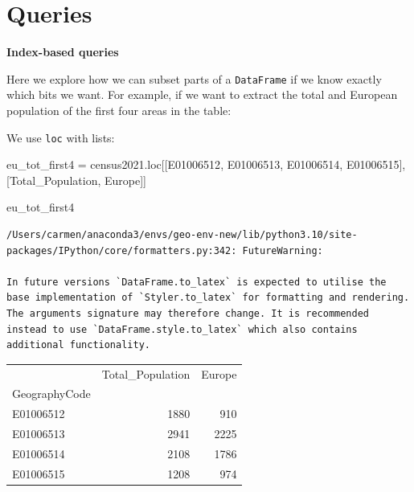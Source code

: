 \documentclass[
  letterpaper,
  DIV=11,
  numbers=noendperiod]{scrreprt}
\newenvironment{Shaded}{\begin{snugshade}}{\end{snugshade}}
\newcommand{\NormalTok}[1]{\textcolor[rgb]{0.00,0.23,0.31}{#1}}
\newcommand{\OperatorTok}[1]{\textcolor[rgb]{0.37,0.37,0.37}{#1}}
\newcommand{\StringTok}[1]{\textcolor[rgb]{0.13,0.47,0.30}{#1}}
\begin{document}
\section*{Queries}\label{queries}


\textbf{Index-based queries}

Here we explore how we can subset parts of a \texttt{DataFrame} if we
know exactly which bits we want. For example, if we want to extract the
total and European population of the first four areas in the table:

We use \texttt{loc} with lists:

\begin{Shaded}
\begin{Highlighting}[]
\NormalTok{eu\_tot\_first4 }\OperatorTok{=}\NormalTok{ census2021.loc[[}\StringTok{\textquotesingle{}E01006512\textquotesingle{}}\NormalTok{, }\StringTok{\textquotesingle{}E01006513\textquotesingle{}}\NormalTok{, }\StringTok{\textquotesingle{}E01006514\textquotesingle{}}\NormalTok{, }\StringTok{\textquotesingle{}E01006515\textquotesingle{}}\NormalTok{], [}\StringTok{\textquotesingle{}Total\_Population\textquotesingle{}}\NormalTok{, }\StringTok{\textquotesingle{}Europe\textquotesingle{}}\NormalTok{]]}

\NormalTok{eu\_tot\_first4}
\end{Highlighting}
\end{Shaded}

\begin{verbatim}
/Users/carmen/anaconda3/envs/geo-env-new/lib/python3.10/site-packages/IPython/core/formatters.py:342: FutureWarning:

In future versions `DataFrame.to_latex` is expected to utilise the base implementation of `Styler.to_latex` for formatting and rendering. The arguments signature may therefore change. It is recommended instead to use `DataFrame.style.to_latex` which also contains additional functionality.
\end{verbatim}

\begin{tabular}{lrr}
\toprule
{} &  Total\_Population &  Europe \\
GeographyCode &                   &         \\
\midrule
E01006512     &              1880 &     910 \\
E01006513     &              2941 &    2225 \\
E01006514     &              2108 &    1786 \\
E01006515     &              1208 &     974 \\
\bottomrule
\end{tabular}
\end{document}
